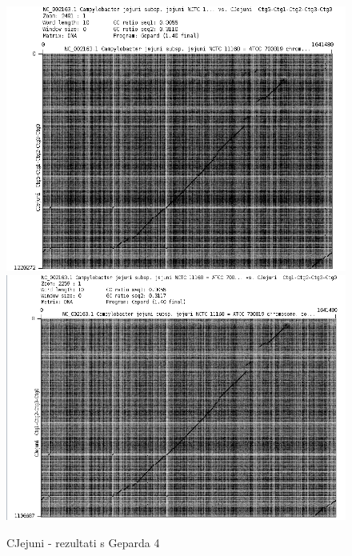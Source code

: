 \begin{figure}[H]
    \centering
    \includegraphics[scale=0.5]{img/Grah4.png}
    \includegraphics[scale=0.5]{img/Grah5.png}
    \caption{CJejuni - rezultati s Geparda 4}
    \label{fig:cjejuni4}
\end{figure}

